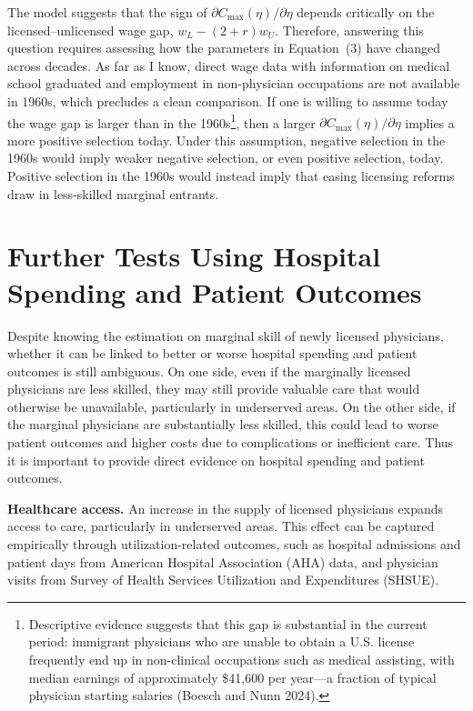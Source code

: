 \documentclass[12pt]{article}
\begin{document}
The model suggests that the sign of $\partial C_{\max}(\eta)/\partial \eta$ depends critically on the licensed--unlicensed wage gap, $w_L - (2+r)w_U$. Therefore, answering this question requires assessing how the parameters in Equation~(3) have changed across decades. As far as I know, direct wage data with information on medical school graduated and employment in non-physician occupations are not available in 1960s, which precludes a clean comparison. If one is willing to assume today the wage gap is larger than in the 1960s\footnote{Descriptive evidence suggests that this gap is substantial in the current period: immigrant physicians who are unable to obtain a U.S. license frequently end up in non-clinical occupations such as medical assisting, with median earnings of approximately \$41,600 per year---a fraction of typical physician starting salaries (Boesch and Nunn 2024).}, then a larger $\partial C_{\max}(\eta)/\partial \eta$ implies a more positive selection today. Under this assumption, negative selection in the 1960s would imply weaker negative selection, or even positive selection, today. Positive selection in the 1960s would instead imply that easing licensing reforms draw in less-skilled marginal entrants. 

\section{Further Tests Using Hospital Spending and Patient Outcomes}

Despite knowing the estimation on marginal skill of newly licensed physicians, whether it can be linked to better or worse hospital spending and patient outcomes is still ambiguous. On one side, even if the marginally licensed physicians are less skilled, they may still provide valuable care that would otherwise be unavailable, particularly in underserved areas. On the other side, if the marginal physicians are substantially less skilled, this could lead to worse patient outcomes and higher costs due to complications or inefficient care. Thus it is important to provide direct evidence on hospital spending and patient outcomes.

\textbf{Healthcare access.} An increase in the supply of licensed physicians expands access to care, particularly in underserved areas. This effect can be captured empirically through utilization-related outcomes, such as hospital admissions and patient days from American Hospital Association (AHA) data, and physician visits from Survey of Health Services Utilization and Expenditures (SHSUE). 
\end{document}
